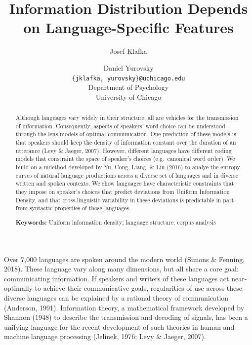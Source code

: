 \documentclass[10pt, letterpaper]{article}
\title{Information Distribution Depends on Language-Specific Features}
\author{Josef Klafka \and Daniel Yurovsky \\
        \texttt{\{jklafka, yurovsky\}@uchicago.edu} \\
       Department of Psychology \\ University of Chicago}
\begin{document}
\maketitle

\begin{abstract}
Although languages vary widely in their structure, all are vehicles for
the transmission of information. Consequently, aspects of speakers' word
choice can be understood through the lens models of optimal
communication. One prediction of these models is that speakers should
keep the density of information constant over the duration of an
utterance (Levy \& Jaeger, 2007). However, different languages have
different coding models that constraint the space of speaker's choices
(e.g.~canonical word order). We build on a mdethod developed by Yu,
Cong, Liang, \& Liu (2016) to analye the entropy curves of natural
language productions across a diverse set of languages and in diverse
written and spoken contexts. We show languages have characteristic
constraints that they impose on speaker's choices that predict
deviations from Uniform Information Density, and that cross-linguistic
variability in these deviations is predictable in part from syntactic
properties of those languages.

\textbf{Keywords:}
Uniform information density; language structure; corpus analysis
\end{abstract}

Over 7,000 languages are spoken around the modern world (Simons \&
Fenning, 2018). These language vary along many dimensions, but all share
a core goal: communicating information. If speakers and writers of these
languages act near-optimally to achieve their communicative goals,
regularities of use across these diverse languages can be explained by a
rational theory of communication (Anderson, 1991). Information theory, a
mathematical framework developed by Shannon (1948) to describe the
transmission and decoding of signals, has been a unifying language for
the recent development of such theories in human and machine language
processing (Jelinek, 1976; Levy \& Jaeger, 2007).
\end{document}
